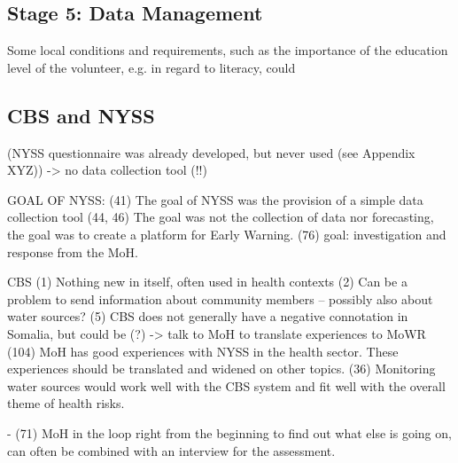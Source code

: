 \subsection{Stage 5: Data Management}

Some local conditions and requirements, such as the importance of the education level of the volunteer, e.g. in regard to literacy, could 


\subsection{CBS and NYSS} (NYSS questionnaire was already developed, but never used (see Appendix XYZ))
-> no data collection tool (!!) 















GOAL OF NYSS:
(41) The goal of NYSS was the provision of a simple data collection tool
(44, 46) The goal was not the collection of data nor forecasting, the goal was to create a platform for Early Warning.
(76) goal: investigation and response from the MoH.

CBS
(1) Nothing new in itself, often used in health contexts
(2) Can be a problem to send information about community members – possibly also about water sources? 
(5) CBS does not generally have a negative connotation in Somalia, but could be (?) -> talk to MoH to translate experiences to MoWR
(104) MoH has good experiences with NYSS in the health sector. These experiences should be translated and widened on other topics.
(36) Monitoring water sources would work well with the CBS system and fit well with the overall theme of health risks.


-	(71) MoH in the loop right from the beginning to find out what else is going on, can often be combined with an interview for the assessment.


